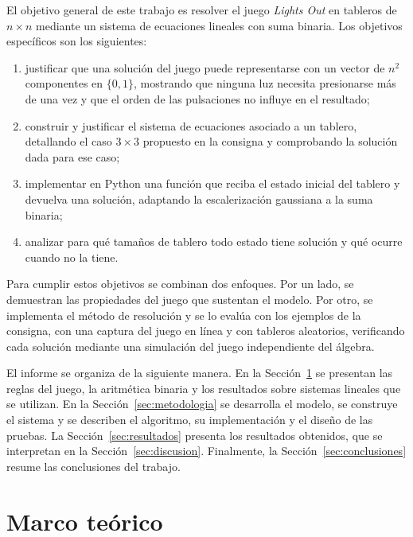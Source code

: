 \documentclass[12pt,a4paper]{article}
\theoremstyle{plain}
\theoremstyle{definition}
\theoremstyle{remark}
\begin{document}
El objetivo general de este trabajo es resolver el juego \textit{Lights Out} en tableros de $n\times n$ mediante un sistema de ecuaciones lineales con suma binaria. Los objetivos específicos son los siguientes:
\begin{enumerate}[label=(\alph*),leftmargin=2em,itemsep=0pt]
  \item justificar que una solución del juego puede representarse con un vector de $n^2$ componentes en $\{0,1\}$, mostrando que ninguna luz necesita presionarse más de una vez y que el orden de las pulsaciones no influye en el resultado;
  \item construir y justificar el sistema de ecuaciones asociado a un tablero, detallando el caso $3\times 3$ propuesto en la consigna y comprobando la solución dada para ese caso;
  \item implementar en Python una función que reciba el estado inicial del tablero y devuelva una solución, adaptando la escalerización gaussiana a la suma binaria;
  \item analizar para qué tamaños de tablero todo estado tiene solución y qué ocurre cuando no la tiene.
\end{enumerate}

Para cumplir estos objetivos se combinan dos enfoques. Por un lado, se demuestran las propiedades del juego que sustentan el modelo. Por otro, se implementa el método de resolución y se lo evalúa con los ejemplos de la consigna, con una captura del juego en línea y con tableros aleatorios, verificando cada solución mediante una simulación del juego independiente del álgebra.

El informe se organiza de la siguiente manera. En la Sección~\ref{sec:marco} se presentan las reglas del juego, la aritmética binaria y los resultados sobre sistemas lineales que se utilizan. En la Sección~\ref{sec:metodologia} se desarrolla el modelo, se construye el sistema y se describen el algoritmo, su implementación y el diseño de las pruebas. La Sección~\ref{sec:resultados} presenta los resultados obtenidos, que se interpretan en la Sección~\ref{sec:discusion}. Finalmente, la Sección~\ref{sec:conclusiones} resume las conclusiones del trabajo.

\section{Marco teórico}\label{sec:marco}
\end{document}
